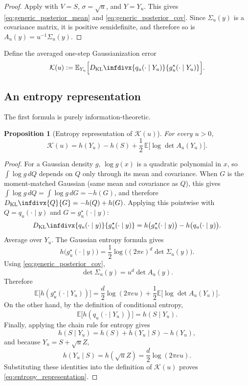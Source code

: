 \documentclass[11pt]{article}
\def\E{\mathbb{E}}
\newcommand{\kl}{D_{\mathrm{KL}}\infdivx}
\newtheorem{prop}{Proposition}
\begin{document}
\begin{proof}
Apply  with \(V=S\), \(\sigma=\sqrt{u}\), and \(Y=Y_u\). This gives \eqref{eq:generic_posterior_mean} and \eqref{eq:generic_posterior_cov}. Since \(\Sigma_u(y)\) is a covariance matrix, it is positive semidefinite, and therefore so is \(A_u(y)=u^{-1}\Sigma_u(y)\).

\end{proof}

Define the averaged one-step Gaussianization error
\begin{equation}
\label{eq:K_u_def}
\mathcal K(u)
:=
\E_{Y_u}\Big[\kl{q_u(\cdot\mid Y_u)}{g_u^\star(\cdot\mid Y_u)}\Big].
\end{equation}

\subsection{An entropy representation}

The first formula is purely information-theoretic.

\begin{prop}[Entropy representation of \(\mathcal K(u)\)]
\label{prop:entropy_representation}
For every \(u>0\),
\begin{equation}
\label{eq:entropy_representation}
\mathcal K(u)
=
 h(Y_u)-h(S)
+
\frac12\,\E\big[\log\det A_u(Y_u)\big].
\end{equation}
\end{prop}

\begin{proof}
For a Gaussian density \(g\), \(\log g(x)\) is a quadratic polynomial in \(x\), so \(\int\log g\,dQ\) depends on \(Q\) only through its mean and covariance. When \(G\) is the moment-matched Gaussian (same mean and covariance as \(Q\)), this gives \(\int\log g\,dQ = \int\log g\,dG = -h(G)\), and therefore \(\kl{Q}{G}=-h(Q)+h(G)\). Applying this pointwise with \(Q=q_u(\cdot\mid y)\) and \(G=g_u^\star(\cdot\mid y)\):
\[
\kl{q_u(\cdot\mid y)}{g_u^\star(\cdot\mid y)}
=
 h\bigl(g_u^\star(\cdot\mid y)\bigr) - h\bigl(q_u(\cdot\mid y)\bigr).
\]
Average over \(Y_u\). The Gaussian entropy formula gives
\[
h\bigl(g_u^\star(\cdot\mid y)\bigr)
=
\frac12\log\Big((2\pi e)^d\det\Sigma_u(y)\Big).
\]
Using \eqref{eq:generic_posterior_cov},
\[
\det\Sigma_u(y)=u^d\det A_u(y).
\]
Therefore
\[
\E\big[h(g_u^\star(\cdot\mid Y_u))\big]
=
\frac d2\log(2\pi e u)
+
\frac12\E\big[\log\det A_u(Y_u)\big].
\]
On the other hand, by the definition of conditional entropy,
\[
\E\big[h(q_u(\cdot\mid Y_u))\big]=h(S\mid Y_u).
\]
Finally, applying the chain rule for entropy gives
\[
h(S\mid Y_u)=h(S)+h(Y_u\mid S)-h(Y_u),
\]
and because \(Y_u=S+\sqrt{u}Z\),
\[
h(Y_u\mid S)=h(\sqrt{u}Z)=\frac d2\log(2\pi e u).
\]
Substituting these identities into the definition of \(\mathcal K(u)\) proves \eqref{eq:entropy_representation}.
\end{proof}
\end{document}
